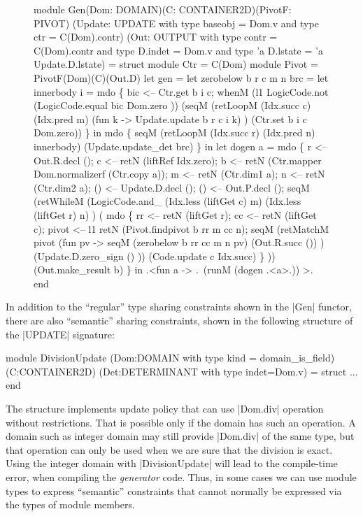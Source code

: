 \documentclass{llncs}
\begin{document}
\begin{figure}
\begin{code}
module Gen(Dom: DOMAIN)(C: CONTAINER2D)(PivotF: PIVOT)
          (Update: UPDATE with type baseobj = Dom.v and type ctr = C(Dom).contr)
          (Out: OUTPUT with type contr = C(Dom).contr and type D.indet = Dom.v 
                        and type 'a D.lstate = 'a Update.D.lstate) = struct
    module Ctr = C(Dom)
    module Pivot = PivotF(Dom)(C)(Out.D)
    let gen =
      let zerobelow b r c m n brc =
        let innerbody i = mdo \{
            bic <-- Ctr.get b i c;
            whenM (l1 LogicCode.not (LogicCode.equal bic Dom.zero ))
                (seqM (retLoopM (Idx.succ c) (Idx.pred m)
                          (fun k -> Update.update b r c i k) )
                      (Ctr.set b i c Dom.zero)) \} in 
        mdo \{
              seqM (retLoopM (Idx.succ r) (Idx.pred n) innerbody) 
                   (Update.update_det brc) \} in
      let dogen a = mdo \{
          r <-- Out.R.decl ();
          c <-- retN (liftRef Idx.zero);
          b <-- retN (Ctr.mapper Dom.normalizerf (Ctr.copy a));
          m <-- retN (Ctr.dim1 a);
          n <-- retN (Ctr.dim2 a);
          () <-- Update.D.decl ();
          () <-- Out.P.decl ();
          seqM 
            (retWhileM (LogicCode.and_ (Idx.less (liftGet c) m)
                                       (Idx.less (liftGet r) n) )
               ( mdo \{
               rr <-- retN (liftGet r);
               cc <-- retN (liftGet c);
               pivot <-- l1 retN (Pivot.findpivot b rr m cc n);
               seqM (retMatchM pivot (fun pv -> 
                        seqM (zerobelow b rr cc m n pv)
                             (Out.R.succ ()) )
                        (Update.D.zero_sign () ))
                    (Code.update c Idx.succ) \} ))
            (Out.make_result b) \} in
    .<fun a -> .~(runM (dogen .<a>.)) >.
end
\end{code}
\end{figure}

In addition to the ``regular'' type sharing constraints shown in the
|Gen| functor, there are also ``semantic'' sharing constraints, shown
in the following structure of the |UPDATE| signature:

\begin{code}
module DivisionUpdate
  (Dom:DOMAIN with type kind = domain_is_field)
  (C:CONTAINER2D)
  (Det:DETERMINANT with type indet=Dom.v) = struct ... end
\end{code}

The structure implements update policy that can use |Dom.div| operation without
restrictions. That is possible only if the domain has such an
operation. A domain such as integer domain may still provide |Dom.div|
of the same type, but that operation can only be used when we are sure
that the division is exact. Using the integer domain with
|DivisionUpdate| will lead to the compile-time error, when compiling
the \emph{generator} code. Thus, in some cases we can use module types
to express ``semantic'' constraints that cannot normally be expressed
via the types of module members.
\end{document}
